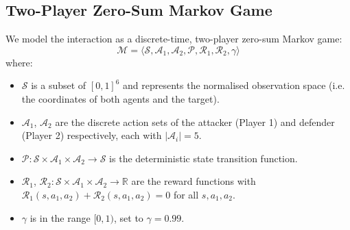 \documentclass[conference]{IEEEtran}
\begin{document}
\subsection{Two-Player Zero-Sum Markov Game}
We model the interaction as a discrete-time, two-player zero-sum Markov game:
\begin{equation}
\mathcal{M} =\langle \mathcal{S}, \mathcal{A}_1, \mathcal{A}_2, \mathcal{P}, \mathcal{R}_1, \mathcal{R}_2, \gamma \rangle
\end{equation}
where:
\begin{itemize}
       \item $\mathcal{S}$ is a subset of $[0,1]^6$ and represents the normalised observation space (i.e. the coordinates of both agents and the target).
       \item $\mathcal{A}_1$, $\mathcal{A}_2$ are the discrete action sets of the attacker (Player 1) and defender (Player 2) respectively, each with $|\mathcal{A}_i| = 5$.
       \item $\mathcal{P}: \mathcal{S} \times \mathcal{A}_1 \times \mathcal{A}_2 \longrightarrow \mathcal{S}$ is the deterministic state transition function.
       \item $\mathcal{R}_1$, $\mathcal{R}_2: \mathcal{S} \times \mathcal{A}_1 \times \mathcal{A}_2 \to \mathbb{R}$ are the reward functions with $\mathcal{R}_1(s,a_1,a_2) + \mathcal{R}_2(s,a_1,a_2) = 0$ for all $s,a_1,a_2$.
       \item $\gamma$ is in the range $[0,1)$, set to $\gamma = 0.99$.
\end{itemize}
\end{document}
